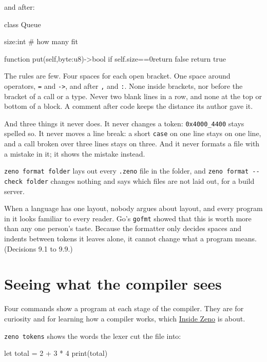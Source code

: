and after:

\begin{zeno}[file=queue.zeno, dir=fmt, show=no, cmd=zeno format {file} ;; cat {file}]
class  Queue{

  size:int      # how many fit


  function put(self,byte:u8)->bool{
    if self.size==0{return false}
  return true
 }
}
\end{zeno}

The rules are few. Four spaces for each open bracket. One space
around operators, \verb|=| and \verb|->|, and after \verb|,| and
\verb|:|. None inside brackets, nor before the bracket of a call or a
type. Never two blank lines in a row, and none at the top or bottom of
a block. A comment after code keeps the distance its author gave it.

And three things it never does. It never changes a token:
\verb|0x4000_4400| stays spelled so. It never moves a line break: a
short \verb|case| on one line stays on one line, and a call broken over
three lines stays on three. And it never formats a file with a mistake
in it; it shows the mistake instead.

\verb|zeno format folder| lays out every \verb|.zeno| file in the
folder, and \verb|zeno format --check folder| changes nothing and says
which files are not laid out, for a build server.

\begin{why}
When a language has one layout, nobody argues about layout, and every
program in it looks familiar to every reader. Go's \verb|gofmt| showed
that this is worth more than any one person's taste. Because the
formatter only decides spaces and indents between tokens it leaves
alone, it cannot change what a program means. (Decisions 9.1 to 9.9.)
\end{why}

\section{Seeing what the compiler sees}

Four commands show a program at each stage of the compiler. They are
for curiosity and for learning how a compiler works, which
\hyperref[ch-inside]{Inside Zeno} is about.

\verb|zeno tokens| shows the words the lexer cut the file into:

\begin{zeno}[file=tiny.zeno, dir=see, cmd=zeno tokens {file}]
let total = 2 + 3 * 4
print(total)
\end{zeno}

